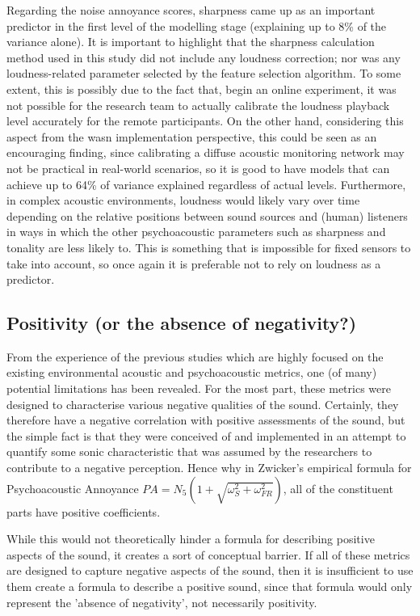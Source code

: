  Regarding the noise annoyance scores, sharpness came up as an important predictor in the first level of the modelling stage (explaining up to 8\% of the variance alone). It is important to highlight that the sharpness calculation method used in this study did not include any loudness correction; nor was any loudness-related parameter selected by the feature selection algorithm. To some extent, this is possibly due to the fact that, begin an online experiment, it was not possible for the research team to actually calibrate the loudness playback level accurately for the remote participants. On the other hand, considering this aspect from the \gls{wasn} implementation perspective, this could be seen as an encouraging finding, since calibrating a diffuse acoustic monitoring network may not be practical in real-world scenarios, so it is good to have models that can achieve up to 64\% of variance explained regardless of actual levels. Furthermore, in complex acoustic environments, loudness would likely vary over time depending on the relative positions between sound sources and (human) listeners in ways in which the other psychoacoustic parameters such as sharpness and tonality are less likely to. This is something that is impossible for fixed sensors to take into account, so once again it is preferable not to rely on loudness as a predictor.

\subsection*{Positivity (or the absence of negativity?)}
From the experience of the previous studies which are highly focused on the existing environmental acoustic and psychoacoustic metrics, one (of many) potential limitations has been revealed. For the most part, these metrics were designed to characterise various negative qualities of the sound. Certainly, they therefore have a negative correlation with positive assessments of the sound, but the simple fact is that they were conceived of and implemented in an attempt to quantify some sonic characteristic that was assumed by the researchers to contribute to a negative perception. Hence why in Zwicker's empirical formula for Psychoacoustic Annoyance \citep{PsychoacousticsfactsmodelsZwicker} $PA = N_5 (1 + \sqrt{\omega^2_S + \omega^2_{FR}})$, all of the constituent parts have positive coefficients.

While this would not theoretically hinder a formula for describing positive aspects of the sound, it creates a sort of conceptual barrier. If all of these metrics are designed to capture negative aspects of the sound, then it is insufficient to use them create a formula to describe a positive sound, since that formula would only represent the 'absence of negativity', not necessarily positivity.

